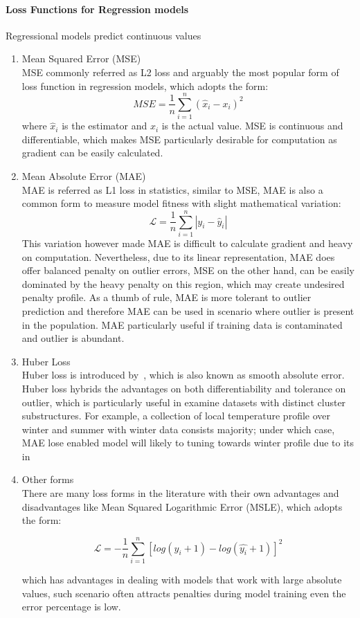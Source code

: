 \paragraph {Loss Functions for Regression models}
Regressional models predict continuous values
\begin{enumerate}
    \item Mean Squared Error (MSE) \\
MSE commonly referred as L2 loss and arguably the most popular form of loss function in regression models, which adopts the form:
\begin{equation}
    MSE = \frac{1}{n}\sum_{i=1}^n (\hat{x}_i - x_i)^2
\end{equation}
where $\hat{x}_i$ is the estimator and $x_i$ is the actual value. MSE is continuous and differentiable, which makes MSE particularly desirable for computation as gradient can be easily calculated. 
    \item Mean Absolute Error (MAE) \\
MAE is referred as L1 loss in statistics, similar to MSE, MAE is also a common form to measure model fitness with slight mathematical variation:
\begin{equation}
    \mathcal{L} = \frac {1}{n} \sum_{i=1}^n |y_i - \hat{y}_i|
\end{equation}
This variation however made MAE is difficult to calculate gradient and heavy on computation. Nevertheless, due to its linear representation, MAE does offer balanced penalty on outlier errors, MSE on the other hand, can be easily dominated by the heavy penalty on this region, which may create undesired penalty profile. As a thumb of rule, MAE is more tolerant to outlier prediction and therefore MAE can be used in scenario where outlier is present in the population. MAE particularly useful if training data is contaminated and outlier is abundant. 
    \item Huber Loss\\
Huber loss is introduced by~\citet{Huber_1964}, which is also known as smooth absolute error. Huber loss hybrids the advantages on both differentiability and tolerance on outlier, which is particularly useful in examine datasets with distinct cluster substructures. For example, a collection of local temperature profile over winter and summer with winter data consists majority; under which case, MAE lose enabled model will likely to tuning towards winter profile due to its in 
    \item Other forms\\
There are many loss forms in the literature with their own advantages and disadvantages like Mean Squared Logarithmic Error (MSLE), which adopts the form:

\begin{equation}
    \mathcal{L} = -\frac{1}{n}\sum_{i=1}^n [log (y_i + 1) -  log(\hat{y_i} + 1) ]^2 
\end{equation}

which has advantages in dealing with models that work with large absolute values, such scenario often attracts penalties during model training even the error percentage is low. 
\end{enumerate}

